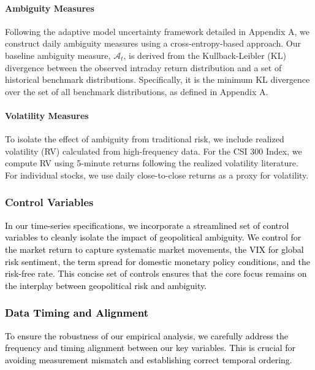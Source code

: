 \documentclass[preprint,12pt,authoryear]{elsarticle}
\begin{document}
\paragraph{Ambiguity Measures}
Following the adaptive model uncertainty framework detailed in Appendix A, we construct daily ambiguity measures using a cross-entropy-based approach. Our baseline ambiguity measure, $\mathcal{A}_t$, is derived from the Kullback-Leibler (KL) divergence between the observed intraday return distribution and a set of historical benchmark distributions. Specifically, it is the minimum KL divergence over the set of all benchmark distributions, as defined in Appendix A.


\paragraph{Volatility Measures}
To isolate the effect of ambiguity from traditional risk, we include realized volatility (RV) calculated from high-frequency data. For the CSI 300 Index, we compute RV using 5-minute returns following the realized volatility literature. For individual stocks, we use daily close-to-close returns as a proxy for volatility.

\subsubsection{Control Variables}

\textcolor{black}{In our time-series specifications, we incorporate a streamlined set of control variables to cleanly isolate the impact of geopolitical ambiguity. We control for the market return to capture systematic market movements, the VIX for global risk sentiment, the term spread for domestic monetary policy conditions, and the risk-free rate. This concise set of controls ensures that the core focus remains on the interplay between geopolitical risk and ambiguity.}

\subsubsection{\textcolor{black}{Data Timing and Alignment}}
\textcolor{black}{To ensure the robustness of our empirical analysis, we carefully address the frequency and timing alignment between our key variables. This is crucial for avoiding measurement mismatch and establishing correct temporal ordering.}
\end{document}
